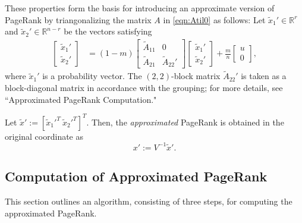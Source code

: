 \documentclass[11pt,draftcls,onecolumn]{IEEEtran}
\newcommand{\field}[1]{{\mathbb{#1}}}
\newcommand{\one}{\mathbf{1}}
\newcommand{\R}{\field{R}}
\begin{document}
These properties form the basis for introducing an approximate version of
PageRank by triangonalizing the matrix $A$ in \eqref{eqn:Atil0} as follows: 
Let $\widetilde{x}_1'\in\R^{r}$ and $\widetilde{x}_2'\in\R^{n-r}$ be
the vectors satisfying 
\begin{align}
 \begin{bmatrix}
   \widetilde{x}_1'\\
   \widetilde{x}_2'
 \end{bmatrix}
  &= (1-m)\begin{bmatrix}
             \widetilde{A}_{11} & 0\\
             \widetilde{A}_{21} & \widetilde{A}_{22}'
          \end{bmatrix}
           \begin{bmatrix}
             \widetilde{x}_1'\\
             \widetilde{x}_2'
           \end{bmatrix}
      + \frac{m}{n}
           \begin{bmatrix}
             u\\
             0
           \end{bmatrix},
  \label{eqn:Atil0dash}
\end{align}
where $\widetilde{x}_1'$ is a probability vector.
The $(2,2)$-block matrix $\widetilde{A}_{22}'$
is taken as a block-diagonal matrix in accordance with the grouping;
for more details, see ``Approximated PageRank Computation."

Let $\widetilde{x}':=[\widetilde{x}_1'^T~\widetilde{x}_2'^T]^T$.
Then, the \textit{approximated} PageRank is obtained in the original coordinate as
\begin{equation}
   x':= V^{-1}\widetilde{x}'.
 \label{eqn:xdash0} 
\end{equation}

\subsection*{Computation of Approximated PageRank}

This section outlines an algorithm, consisting of three steps, for computing the approximated PageRank.
\end{document}
